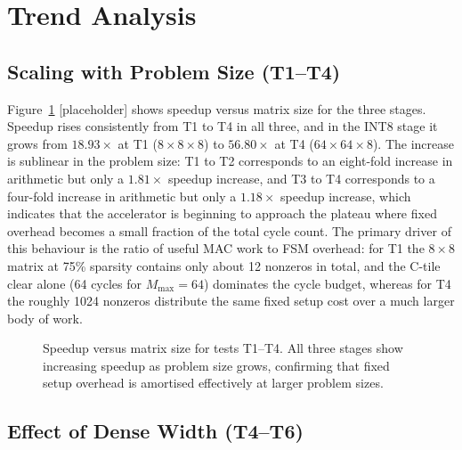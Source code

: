 \section{Trend Analysis}

\subsection{Scaling with Problem Size (T1--T4)}

Figure~\ref{fig:speedup-size} [placeholder] shows speedup versus matrix
size for the three stages. Speedup rises consistently from T1 to T4 in
all three, and in the INT8 stage it grows from $18.93\times$ at T1
($8 \times 8 \times 8$) to $56.80\times$ at T4 ($64 \times 64 \times 8$).
The increase is sublinear in the problem size: T1 to T2 corresponds to
an eight-fold increase in arithmetic but only a $1.81\times$ speedup
increase, and T3 to T4 corresponds to a four-fold increase in arithmetic
but only a $1.18\times$ speedup increase, which indicates that the
accelerator is beginning to approach the plateau where fixed overhead
becomes a small fraction of the total cycle count. The primary driver of
this behaviour is the ratio of useful MAC work to FSM overhead: for T1
the $8 \times 8$ matrix at 75\% sparsity contains only about 12 nonzeros
in total, and the C-tile clear alone (64 cycles for $M_{\max} = 64$)
dominates the cycle budget, whereas for T4 the roughly 1024 nonzeros
distribute the same fixed setup cost over a much larger body of work.

\begin{figure}[htbp]
  \centering
  \caption{Speedup versus matrix size for tests T1--T4. All three stages
           show increasing speedup as problem size grows, confirming that
           fixed setup overhead is amortised effectively at larger
           problem sizes.}
  \label{fig:speedup-size}
\end{figure}

\subsection{Effect of Dense Width (T4--T6)}


